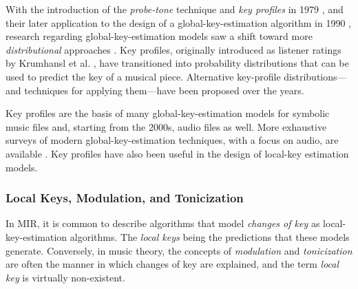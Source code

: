 With the introduction of the \emph{probe-tone} technique and \emph{key profiles} in 1979 \cite{krumhansl_quantification_1979}, and their later application to the design of a global-key-estimation algorithm in 1990 \cite{krumhansl_cognitive_1990}, research regarding global-key-estimation models saw a shift toward more \emph{distributional} approaches \cite{temperley2008pitch}. 
Key profiles, originally introduced as listener ratings by Krumhansl et al. \cite{krumhansl_quantification_1979, krumhansl_tracing_1982}, have transitioned into probability distributions that can be used to predict the key of a musical piece.
Alternative key-profile distributions---and techniques for applying them---have been proposed over the years.



Key profiles are the basis of many global-key-estimation models for symbolic music files and, starting from the 2000s, audio files as well. More exhaustive surveys of modern global-key-estimation techniques, with a focus on audio, are available \cite{korzeniowski_harmonic_2018, campbell_automatic_2010}. Key profiles have also been useful in the design of local-key estimation models.

\subsubsection{Local Keys, Modulation, and Tonicization}\label{ssec:terminology}

In MIR, it is common to describe algorithms that model \emph{changes of key} as local-key-estimation algorithms. 
The \emph{local keys} being the predictions that these models generate. Conversely, in music theory, the concepts of \emph{modulation} and \emph{tonicization} are often the manner in which changes of key are explained, and the term \emph{local key} is virtually non-existent.

